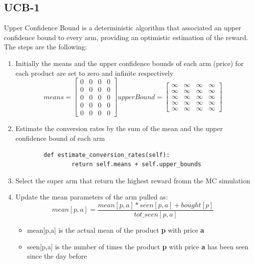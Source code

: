 \subsection{UCB-1}
Upper Confidence Bound is a deterministic algorithm that associated an upper confidence bound to every arm, providing an optimistic estimation of the reward.
The steps are the following:
\begin{enumerate}
    \item Initially the means and the upper confidence bounds of each arm (price) for each product are set to zero and infinite respectively \[ means=
    \begin{bmatrix}
            0 & 0 & 0 & 0\\
            0 & 0 & 0 & 0\\
            0 & 0 & 0 & 0\\
            0 & 0 & 0 & 0\\
            0 & 0 & 0 & 0
    \end{bmatrix}upperBound=
    \begin{bmatrix}
            \infty & \infty & \infty & \infty\\
            \infty & \infty & \infty & \infty\\
            \infty & \infty & \infty & \infty\\
            \infty & \infty & \infty & \infty\\
            \infty & \infty & \infty & \infty
    \end{bmatrix}
    \]
    \item Estimate the conversion rates by the sum of the mean and the upper confidence bound of each arm\begin{verbatim}
        def estimate_conversion_rates(self):
                return self.means + self.upper_bounds
        \end{verbatim}
    \item Select the super arm that return the highest reward fromn the MC simulation
    \item Update the mean parameters of the arm pulled as:\begin{equation}
            mean[p,a] = \frac{mean[p,a] * seen[p,a] + bought[p]}{tot\_seen[p,a]}
        \end{equation}
        \begin{itemize}
            \item mean[p,a] is the actual mean of the product {\bf p} with price {\bf a}
            \item seen[p,a] is the number of times the product {\bf p} with price {\bf a} has been seen since the day before

\end{itemize}
\end{enumerate}
